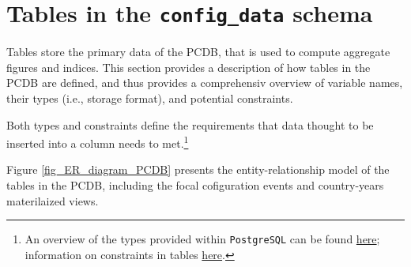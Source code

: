\section{Tables in the \texttt{config\_data} schema}\label{sec_tables}

Tables store the primary data of the PCDB, that is used to compute aggregate figures and indices.
This section provides a description of how tables in the PCDB are defined, and thus provides a comprehensiv overview of variable names, their types (i.e., storage format), and potential constraints.

Both types and constraints define the requirements that data thought to be inserted into a column needs to met.\footnote{%
An overview of the types provided within \texttt{PostgreSQL} can be found \href{http://www.postgresql.org/docs/9.3/static/datatype.html}{here}; information on constraints in tables \href{http://www.postgresql.org/docs/9.3/static/ddl-constraints.html}{here}.}

Figure \ref{fig_ER_diagram_PCDB} presents the entity-relationship model of the tables in the PCDB, including the focal cofiguration events and country-years materilaized views.

\label{fig_ER_diagram_PCDB}

		
				
		

		
		
		
		
		
		
		
 	
		
		
		

		
		
		
		
		
		
